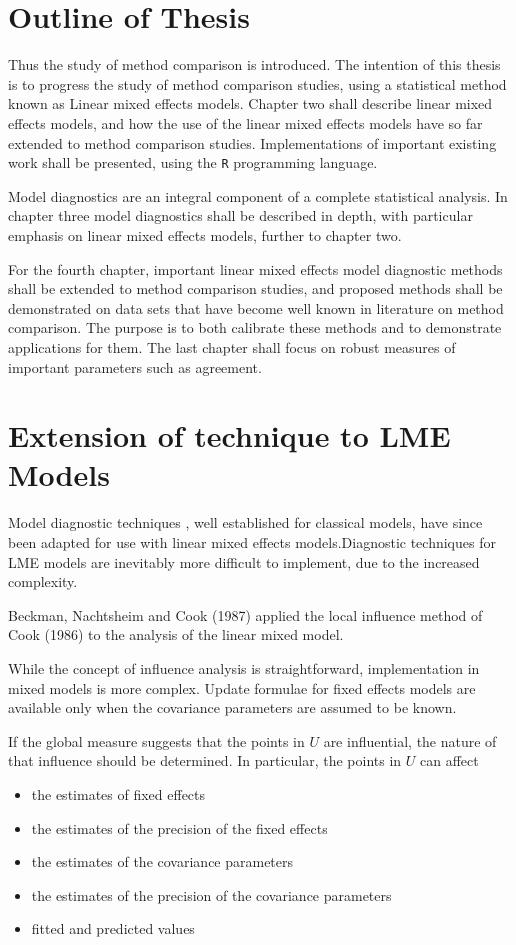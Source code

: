 \documentclass[12pt, a4paper]{report}
\theoremstyle{plain}
\theoremstyle{definition}
\theoremstyle{remark}
\begin{document}
\section{Outline of Thesis}
Thus the study of method comparison is introduced. The intention of this thesis is to progress the
study of method comparison studies, using a statistical method known as Linear mixed effects models.
Chapter two shall describe linear mixed effects models, and how the use of the linear mixed
effects models have so far extended to method comparison studies. Implementations of important existing work shall be presented, using the \texttt{R} programming language.

Model diagnostics are an integral component of a complete statistical analysis.
In chapter three model diagnostics shall be described in depth, with particular
emphasis on linear mixed effects models, further to chapter two.

For the fourth chapter, important linear mixed effects model diagnostic methods shall be extended to method comparison studies, and proposed methods shall be demonstrated on data sets that have become well known in literature on method comparison. The purpose is to both calibrate these methods and to demonstrate applications for them.
The last chapter shall focus on robust measures of important parameters such as agreement.



\section{Extension of technique to LME Models} %

Model diagnostic techniques , well established for classical models, have since been adapted for use with linear mixed effects models.Diagnostic techniques for LME models are inevitably more difficult to implement, due to the increased complexity.

Beckman, Nachtsheim and Cook (1987) applied the local influence method of Cook (1986)
to the analysis of the linear mixed model.


While the concept of influence analysis is straightforward, implementation in mixed models is more complex. Update formulae for fixed effects models are available only when the covariance parameters are assumed to be known.


If the global measure suggests that the points in $U$ are influential, the nature of that influence should be determined. In particular, the points in $U$ can affect
\begin{itemize}
	\item the estimates of fixed effects
	\item the estimates of the precision of the fixed effects
	\item the estimates of the covariance parameters
	\item the estimates of the precision of the covariance parameters
	\item fitted and predicted values
\end{itemize}
\end{document}
